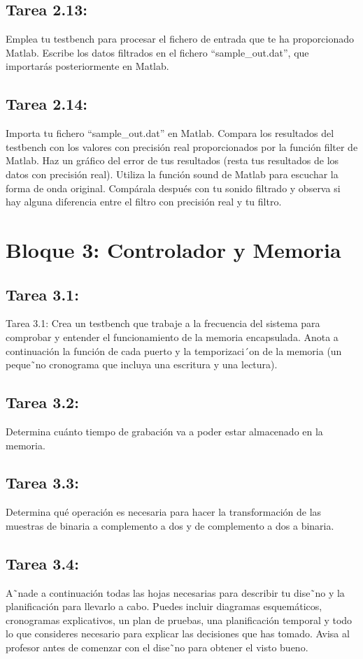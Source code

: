 \documentclass{article}
\begin{document}
\subsection{Tarea 2.13:}
Emplea tu testbench para procesar el fichero de entrada que te ha proporcionado
Matlab. Escribe los datos filtrados en el fichero “sample{\_}out.dat”, que importarás posteriormente en Matlab.

\subsection{Tarea 2.14:}
Importa tu fichero ``sample{\_}out.dat'' en Matlab. Compara los resultados del testbench con los valores con precisión real proporcionados por la función filter de Matlab. Haz un gráfico del error de tus resultados (resta tus resultados de los datos con precisión real).
Utiliza la función sound de Matlab para escuchar la forma de onda original. Compárala después con tu sonido filtrado y observa si hay alguna diferencia entre el filtro con precisión real y tu filtro.

\section{Bloque 3: Controlador y Memoria}

\subsection{Tarea 3.1:}
Tarea 3.1:
Crea un testbench que trabaje a la frecuencia del sistema para comprobar y entender el funcionamiento de la memoria encapsulada. Anota a continuación la función de cada
puerto y la temporizaci´on de la memoria (un peque˜no cronograma que incluya una escritura y una lectura).

\subsection{Tarea 3.2:}

Determina cuánto tiempo de grabación va a poder estar almacenado en la memoria.

\subsection{Tarea 3.3:}
Determina qué operación es necesaria para hacer la transformación de las muestras de binaria a complemento a dos y de complemento a dos a binaria.

\subsection{Tarea 3.4:}
A˜nade a continuación todas las hojas necesarias para describir tu dise˜no y la planificación para llevarlo a cabo. Puedes incluir diagramas esquemáticos, cronogramas explicativos, un plan de pruebas, una planificación temporal y todo lo que consideres necesario para explicar las decisiones que has tomado.
Avisa al profesor antes de comenzar con el dise˜no para obtener el visto bueno.
\end{document}
